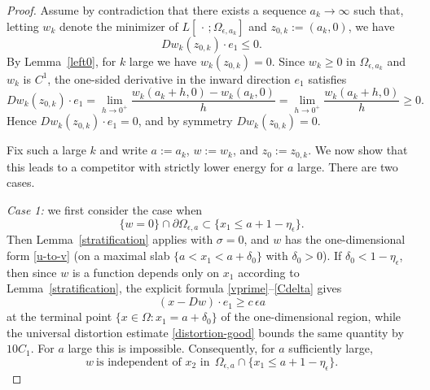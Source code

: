 \documentclass[reqno,11pt]{amsart}
\numberwithin{equation}{section}
\theoremstyle{remark}
\begin{document}
\begin{proof}
Assume by contradiction that there exists a sequence $a_k\to\infty$ such that, letting $w_k$ denote the minimizer of
$L[\,\cdot\,;\Omega_{\epsilon,a_k}]$ and $z_{0,k}:=(a_k,0)$, we have
\[
Dw_k(z_{0,k})\cdot e_1\le0.
\]
By Lemma~\ref{left0}, for $k$ large we have $w_k(z_{0,k})=0$.
Since $w_k\ge0$ in $\Omega_{\epsilon,a_k}$ and $w_k$ is $C^1$, the one-sided derivative in the inward direction $e_1$ satisfies
\[
Dw_k(z_{0,k})\cdot e_1
=\lim_{h\to0^+}\frac{w_k(a_k+h,0)-w_k(a_k,0)}{h}
=\lim_{h\to0^+}\frac{w_k(a_k+h,0)}{h}\ge0.
\]
Hence $Dw_k(z_{0,k})\cdot e_1=0$, and by symmetry $Dw_k(z_{0,k})=0$.

Fix such a large $k$ and write $a:=a_k$, $w:=w_k$, and $z_0:=z_{0,k}$.
We now show that this leads to a competitor with strictly lower energy for $a$ large.
There are two cases.

\smallskip
\noindent\emph{Case 1:} we first consider the case when
\begin{equation}\label{zero-left}
\{w=0\}\cap\partial\Omega_{\epsilon,a}\subset\{x_1\le a+1-\eta_\epsilon\}.
\end{equation}
Then Lemma~\ref{stratification} applies with $\sigma=0$, and $w$ has the one-dimensional form \eqref{u-to-v}
(on a maximal slab $\{a<x_1<a+\delta_0\}$ with $\delta_0>0$).
If $\delta_0<1-\eta_\epsilon$, then since $w$ is a function depends only on $x_1$ according to Lemma~\ref{stratification}, 
the explicit formula \eqref{vprime}--\eqref{Cdelta} gives
\[
(x-Dw)\cdot e_1 \ge c\,\epsilon a
\]
at the terminal point $\{x\in \Omega\colon x_1=a+\delta_0\}$ of the one-dimensional region, while the universal distortion estimate
\eqref{distortion-good} bounds the same quantity by $10C_1$.
For $a$ large this is impossible.
Consequently, for $a$ sufficiently large,
\begin{equation}\label{u-1d-left}
w\ \text{is independent of $x_2$ in}\ \ \Omega_{\epsilon,a}\cap\{x_1\le a+1-\eta_\epsilon\}.
\end{equation}


\end{proof}
\end{document}
